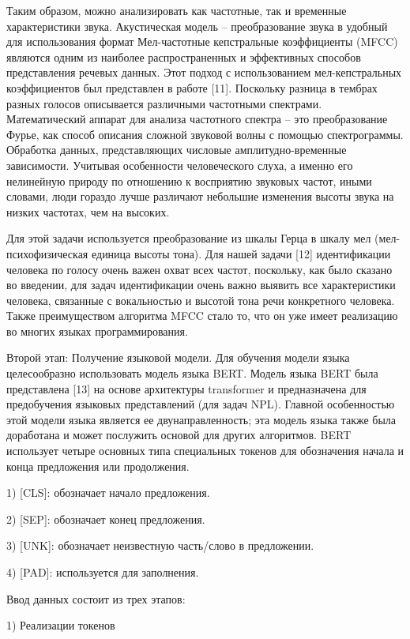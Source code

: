 \begin{multicols}{2}
Таким образом, можно анализировать как частотные, так и временные
характеристики звука. Акустическая модель -- преобразование звука в
удобный для использования формат Мел-частотные кепстральные коэффициенты
(MFCC) являются одним из наиболее распространенных и эффективных
способов представления речевых данных. Этот подход с использованием
мел-кепстральных коэффициентов был представлен в работе {[}11{]}.
Поскольку разница в тембрах разных голосов описывается различными
частотными спектрами. Математический аппарат для анализа частотного
спектра -- это преобразование Фурье, как способ описания сложной
звуковой волны с помощью спектрограммы. Обработка данных, представляющих
числовые амплитудно-временные зависимости. Учитывая особенности
человеческого слуха, а именно его нелинейную природу по отношению к
восприятию звуковых частот, иными словами, люди гораздо лучше различают
небольшие изменения высоты звука на низких частотах, чем на высоких.

Для этой задачи используется преобразование из шкалы Герца в шкалу мел
(мел-психофизическая единица высоты тона). Для нашей задачи {[}12{]}
идентификации человека по голосу очень важен охват всех частот,
поскольку, как было сказано во введении, для задач идентификации очень
важно выявить все характеристики человека, связанные с вокальностью и
высотой тона речи конкретного человека. Также преимуществом алгоритма
MFCC стало то, что он уже имеет реализацию во многих языках
программирования.

Второй этап: Получение языковой модели. Для обучения модели языка
целесообразно использовать модель языка BERT. Модель языка BERT была
представлена {[}13{]} на основе архитектуры transformer и предназначена
для предобучения языковых представлений (для задач NPL). Главной
особенностью этой модели языка является ее двунаправленность; эта модель
языка также была доработана и может послужить основой для других
алгоритмов. BERT использует четыре основных типа специальных токенов для
обозначения начала и конца предложения или продолжения.

1) {[}CLS{]}: обозначает начало предложения.

2) {[}SEP{]}: обозначает конец предложения.

3) {[}UNK{]}: обозначает неизвестную часть/слово в предложении.

4) {[}PAD{]}: используется для заполнения.

Ввод данных состоит из трех этапов:

1) Реализации токенов


\end{multicols}
